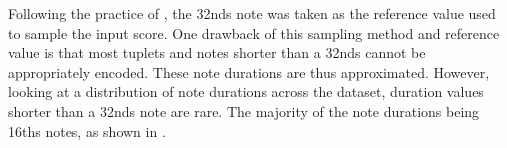 
Following the practice of \textcite{micchi2020not}, the
\glspl{32nd} note was taken as the reference value used to
sample the input score. One drawback of this sampling method
and reference value is that most tuplets and notes shorter
than a \glspl{32nd} cannot be appropriately encoded. These
note durations are thus approximated. However, looking at a
distribution of note durations across the dataset, duration
values shorter than a \glspl{32nd} note are rare. The
majority of the note durations being \glspl{16th} notes, as
shown in . 

